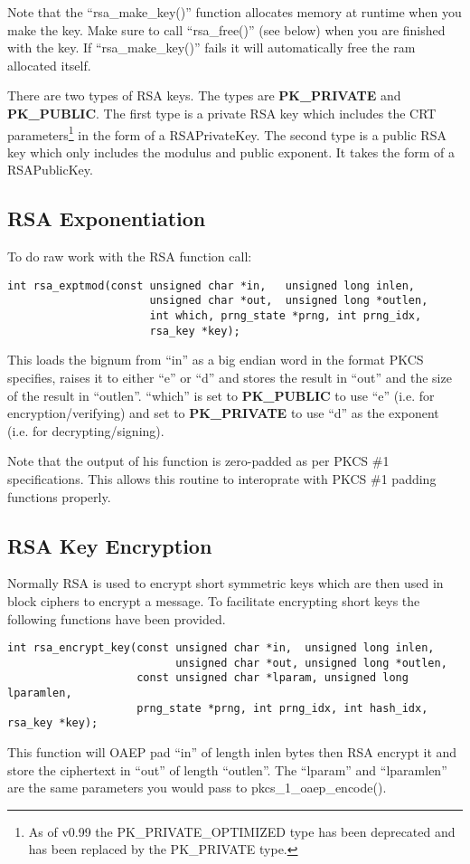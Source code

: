\documentclass[a4paper]{book}
\begin{document}
Note that the ``rsa\_make\_key()'' function allocates memory at runtime when you make the key.  Make sure to call 
``rsa\_free()'' (see below) when you are finished with the key.  If ``rsa\_make\_key()'' fails it will automatically 
free the ram allocated itself.

 
There are two types of RSA keys.  The types are {\bf PK\_PRIVATE} and {\bf PK\_PUBLIC}.  The first type is a private 
RSA key which includes the CRT parameters\footnote{As of v0.99 the PK\_PRIVATE\_OPTIMIZED type has been deprecated
and has been replaced by the PK\_PRIVATE type.} in the form of a RSAPrivateKey.  The second type is a public RSA key
which only includes the modulus and public exponent.  It takes the form of a RSAPublicKey.

\subsection{RSA Exponentiation}

To do raw work with the RSA function call:
\begin{verbatim}
int rsa_exptmod(const unsigned char *in,   unsigned long inlen,
                      unsigned char *out,  unsigned long *outlen, 
                      int which, prng_state *prng, int prng_idx,
                      rsa_key *key);
\end{verbatim}
This loads the bignum from ``in'' as a big endian word in the format PKCS specifies, raises it to either ``e'' or ``d'' and stores the result
in ``out'' and the size of the result in ``outlen''. ``which'' is set to {\bf PK\_PUBLIC} to use ``e'' 
(i.e. for encryption/verifying) and set to {\bf PK\_PRIVATE} to use ``d'' as the exponent (i.e. for decrypting/signing).

Note that the output of his function is zero-padded as per PKCS \#1 specifications.  This allows this routine to 
interoprate with PKCS \#1 padding functions properly.

\subsection{RSA Key Encryption}
Normally RSA is used to encrypt short symmetric keys which are then used in block ciphers to encrypt a message.
To facilitate encrypting short keys the following functions have been provided.

\begin{verbatim}
int rsa_encrypt_key(const unsigned char *in,  unsigned long inlen,
                          unsigned char *out, unsigned long *outlen,
                    const unsigned char *lparam, unsigned long lparamlen,
                    prng_state *prng, int prng_idx, int hash_idx, rsa_key *key);
\end{verbatim}
This function will OAEP pad ``in'' of length inlen bytes then RSA encrypt it and store the ciphertext
in ``out'' of length ``outlen''.  The ``lparam'' and ``lparamlen'' are the same parameters you would pass
to pkcs\_1\_oaep\_encode().
\end{document}
